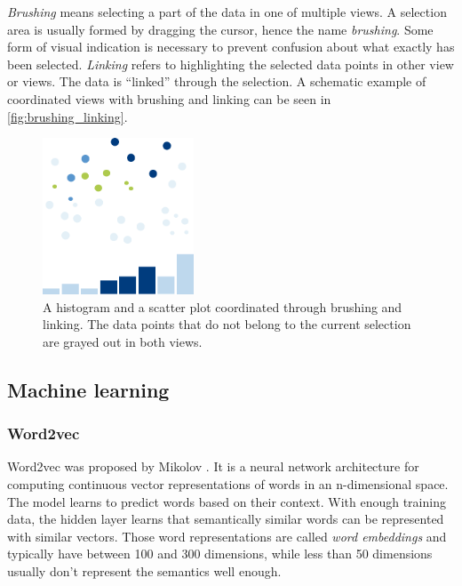 \textit{Brushing} means selecting a part of the data in one of multiple views. 
A selection area is usually formed by dragging the cursor, hence the name \textit{brushing}.
Some form of visual indication is necessary to prevent confusion about what exactly has been selected.
\textit{Linking} refers to highlighting the selected data points in other view or views.
The data is ``linked'' through the selection.
A schematic example of coordinated views with brushing and linking can be seen in \autoref{fig:brushing_linking}.

\begin{figure}[!]
\centering
\includegraphics[width=0.4\textwidth]{img/brushing_linking}
\caption{A histogram and a scatter plot coordinated through brushing and linking. The data points that do not belong to the current selection are grayed out in both views.}
\label{fig:brushing_linking}
\end{figure}

\subsection{Machine learning}
\label{subsec:machine_learning}

\subsubsection{Word2vec}
\label{subsubsec:word2vec}

Word2vec was proposed by Mikolov \cite{Mikolov2013}. 
It is a neural network architecture for computing continuous vector representations of words in an n-dimensional space.
The model learns to predict words based on their context.
With enough training data, the hidden layer learns that semantically similar words can be represented with similar vectors.
Those word representations are called \textit{word embeddings} and typically have between 100 and 300 dimensions, while less than 50 dimensions usually don't represent the semantics well enough.

